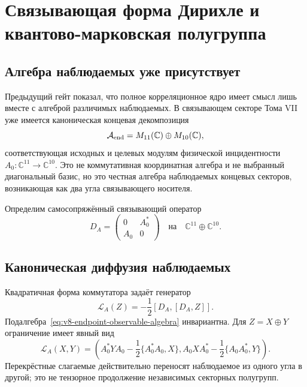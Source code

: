\chapter{Связывающая форма Дирихле и квантово-марковская полугруппа}
\label{ch:v8-linking-dirichlet-quantum-markov-semigroup-gate}

\section{Алгебра наблюдаемых уже присутствует}

Предыдущий гейт показал, что полное корреляционное ядро имеет смысл лишь
вместе с алгеброй различимых наблюдаемых. В связывающем секторе Тома VII
уже имеется каноническая концевая декомпозиция
\begin{equation}
 \mathcal A_{\rm end}=M_{11}(\mathbb C)\oplus M_{10}(\mathbb C),
 \label{eq:v8-endpoint-observable-algebra}
\end{equation}
соответствующая исходных  и целевых модулям физической инцидентности
$A_0:\mathbb C^{11}\to\mathbb C^{10}$. Это не коммутативная координатная
алгебра и не выбранный диагональный базис, но это честная алгебра
наблюдаемых концевых секторов, возникающая как два угла связывающего носителя.

Определим самосопряжённый связывающий оператор
\begin{equation}
 D_A=\begin{pmatrix}0&A_0^*\\A_0&0\end{pmatrix}
 \quad\text{на}\quad \mathbb C^{11}\oplus\mathbb C^{10}.
 \label{eq:v8-linking-dirac}
\end{equation}

\section{Каноническая диффузия наблюдаемых}

Квадратичная форма коммутатора задаёт генератор
\begin{equation}
 \mathcal L_A(Z)=-\frac12[D_A,[D_A,Z]].
 \label{eq:v8-linking-qms-generator}
\end{equation}
Подалгебра~\eqref{eq:v8-endpoint-observable-algebra} инвариантна. Для
$Z=X\oplus Y$ ограничение имеет явный вид
\begin{equation}
 \mathcal L_A(X,Y)=
 \left(
 A_0^*YA_0-\frac12\{A_0^*A_0,X\},
 A_0XA_0^*-\frac12\{A_0A_0^*,Y\}
 \right).
 \label{eq:v8-linking-corner-markov-generator}
\end{equation}
Перекрёстные слагаемые действительно переносят наблюдаемое из одного угла
в другой; это не тензорное продолжение независимых секторных полугрупп.

